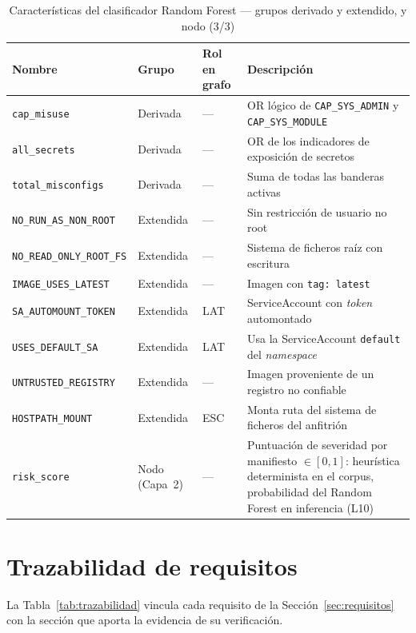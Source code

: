 \begin{table}[htbp]
\centering\small
\caption{Características del clasificador Random Forest — grupos derivado y extendido, y nodo (3/3)}
\label{tab:features_b}
\begin{tabularx}{\textwidth}{@{}Lll>{\hsize}L@{}}
\toprule
Nombre & Grupo & Rol en grafo & Descripción \\
\midrule
\texttt{cap\_misuse} & Derivada & — & OR lógico de \texttt{CAP\_SYS\_ADMIN} y \texttt{CAP\_SYS\_MODULE} \\
\texttt{all\_secrets} & Derivada & — & OR de los indicadores de exposición de secretos \\
\texttt{total\_misconfigs} & Derivada & — & Suma de todas las banderas activas \\
\texttt{NO\_RUN\_AS\_NON\_ROOT} & Extendida & — & Sin restricción de usuario no root \\
\texttt{NO\_READ\_ONLY\_ROOT\_FS} & Extendida & — & Sistema de ficheros raíz con escritura \\
\texttt{IMAGE\_USES\_LATEST} & Extendida & — & Imagen con \texttt{tag: latest} \\
\texttt{SA\_AUTOMOUNT\_TOKEN} & Extendida & LAT & ServiceAccount con \textit{token} automontado \\
\texttt{USES\_DEFAULT\_SA} & Extendida & LAT & Usa la ServiceAccount \texttt{default} del \textit{namespace} \\
\texttt{UNTRUSTED\_REGISTRY} & Extendida & — & Imagen proveniente de un registro no confiable \\
\texttt{HOSTPATH\_MOUNT} & Extendida & ESC & Monta ruta del sistema de ficheros del anfitrión \\
\texttt{risk\_score} & Nodo (Capa~2) & — & Puntuación de severidad por manifiesto \(\in [0,1]\): heurística determinista en el corpus, probabilidad del Random Forest en inferencia (L10) \\
\bottomrule
\end{tabularx}
\fuentepropia
\end{table}

\section{Trazabilidad de requisitos}

La Tabla~\ref{tab:trazabilidad} vincula cada requisito de la
Sección~\ref{sec:requisitos} con la sección que aporta la evidencia de su
verificación.

